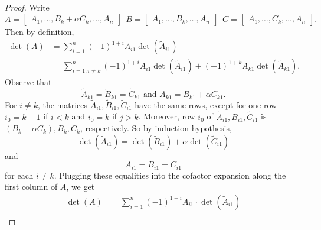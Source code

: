 \documentclass[linearalgebra]{subfiles}
\begin{document}
    \begin{proof}
        Write
        \begin{equation*}
            A = \begin{bmatrix}
                A_1, \ldots, B_k+\alpha C_k, \ldots, A_n
            \end{bmatrix}
            \ \ B =
            \begin{bmatrix}
                A_1, \ldots, B_k, \ldots, A_n
            \end{bmatrix}
            \ \ C =  
            \begin{bmatrix}
                A_1, \ldots, C_k, \ldots, A_n
            \end{bmatrix}.
        \end{equation*}
        Then by definition,
        \begin{align*}
            \det (A) & = \sum^n_{i=1} (-1)^{1+i} A_{i1} \det \left(\widetilde{A}_{i1}\right) \\
                     & = \sum^n_{i=1, i\neq k} (-1)^{1+i} A_{i1} \det \left(\widetilde{A}_{i1}\right) + (-1)^{1+k} A_{k1} \det \left(\widetilde{A}_{k1}\right).
        \end{align*}
        Observe that
        \begin{equation*}
            \widetilde{A}_{k1} = \widetilde{B}_{k1} = \widetilde{C}_{k1} \text{\ \ and\ \ } A_{k1} = B_{k1} + \alpha C_{k1}.
        \end{equation*}
        For $i\neq k$, the matrices $\widetilde{A}_{i1}, \widetilde{B}_{i1}, \widetilde{C}_{i1}$ have the same rows, except for one row $i_0 = k-1$ if $i<k$ and $i_0 = k$ if $j>k$. Moreover, row $i_0$ of $\widetilde{A}_{i1}, \widetilde{B}_{i1}, \widetilde{C}_{i1}$ is $(B_k + \alpha C_k), B_k, C_k$, respectively. So by induction hypothesis, 
        \begin{equation*}
            \det \left(\widetilde{A}_{i1}\right) = \det \left(\widetilde{B}_{i1}\right) + \alpha \det \left(\widetilde{C}_{i1}\right)
        \end{equation*}
        and
        \begin{equation*}
            A_{i1} = B_{i1} = C_{i1}
        \end{equation*}
        for each $i\neq k$. Plugging these equalities into the cofactor expansion along the first column of $A$, we get
        \begin{align*}
            \det (A) & = \sum^n_{i=1} (-1)^{1+i} A_{i1} \cdot \det \left(\widetilde{A}_{i1}\right) \\

\end{align*}
\end{proof}
\end{document}
